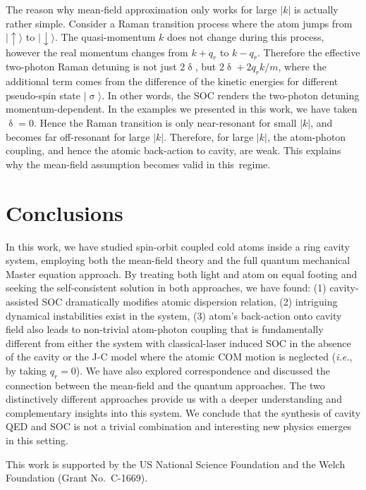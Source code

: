 \documentclass[atoms,article,accept,moreauthors,pdftex,12pt,a4paper]{mdpi}
\begin{document}
The reason why mean-field approximation only works for large $|k|$ is actually rather simple. Consider a Raman transition process where the atom jumps from $|\uparrow \rangle$ to $|\downarrow \rangle$. The quasi-momentum $k$ does not change during this process, however the real momentum changes from $k+q_r$ to $k-q_r$. Therefore the effective two-photon Raman detuning is not just $2\updelta$, but $2\updelta +2q_rk/m$, where the additional term comes from the difference of the kinetic energies for different pseudo-spin state $|\upsigma\rangle$. In other words, the SOC renders the two-photon detuning momentum-dependent. In the examples we presented in this work, we have taken $\updelta=0$. Hence the Raman transition is only near-resonant for small $|k|$, and becomes far off-resonant for large $|k|$. Therefore, for large $|k|$, the atom-photon coupling, and hence the atomic back-action to cavity, are weak. This explains why the mean-field assumption becomes valid in this~regime.


\section{Conclusions} \label{conclusion}

In this work, we have studied spin-orbit coupled cold atoms inside a ring cavity system, employing both the mean-field theory and the full quantum mechanical Master equation approach. By treating both light and atom on equal footing and seeking the self-consistent solution in both approaches, we have found: (1) cavity-assisted SOC dramatically modifies atomic dispersion relation, (2) intriguing dynamical instabilities exist in the system, (3) atom's back-action onto cavity field also leads to non-trivial atom-photon coupling that is fundamentally different from either the system with classical-laser induced SOC in the absence of the cavity or the J-C model where the atomic COM motion is neglected (\emph{i.e.}, by taking $q_r=0$). We have also explored correspondence and discussed the connection between the mean-field and the quantum approaches. The two distinctively different approaches provide us with a deeper understanding and complementary insights into this system. We conclude that the synthesis of cavity QED and SOC is not a trivial combination and interesting new physics emerges in this setting.



This work is supported by the US National Science Foundation and the Welch Foundation (Grant No.~C-1669).
\end{document}
